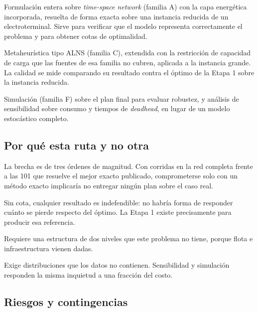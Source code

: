 \documentclass[11pt,a4paper,parskip=half]{scrartcl}
\begin{document}
\begin{campos}
\item[Etapa 1] Formulación entera sobre \textit{time-space network} (familia A) con la capa energética incorporada, resuelta de forma exacta sobre una instancia reducida de un electroterminal. Sirve para verificar que el modelo representa correctamente el problema y para obtener cotas de optimalidad.
\item[Etapa 2] Metaheurística tipo ALNS (familia C), extendida con la restricción de capacidad de carga que las fuentes de esa familia no cubren, aplicada a la instancia grande. La calidad se mide comparando su resultado contra el óptimo de la Etapa 1 sobre la instancia reducida.
\item[Complemento] Simulación (familia F) sobre el plan final para evaluar robustez, y análisis de sensibilidad sobre consumo y tiempos de \textit{deadhead}, en lugar de un modelo estocástico completo.
\end{campos}

\subsection*{Por qué esta ruta y no otra}

\begin{campos}
\item[Contra el exacto puro] La brecha es de tres órdenes de magnitud. Con \corridasReales{} corridas en la red completa frente a las 101 que resuelve el mejor exacto publicado, comprometerse solo con un método exacto implicaría no entregar ningún plan sobre el caso real.
\item[Contra la heurística pura] Sin cota, cualquier resultado es indefendible: no habría forma de responder cuánto se pierde respecto del óptimo. La Etapa 1 existe precisamente para producir esa referencia.
\item[Contra Benders] Requiere una estructura de dos niveles que este problema no tiene, porque flota e infraestructura vienen dadas.
\item[Contra el modelo estocástico] Exige distribuciones que los datos no contienen. Sensibilidad y simulación responden la misma inquietud a una fracción del costo.
\end{campos}

\subsection*{Riesgos y contingencias}
\end{document}
